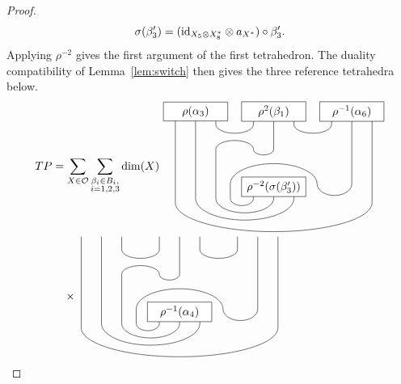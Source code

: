 \documentclass{amsart}
\begin{document}
\begin{proof}
\[
\sigma(\beta'_3)=(\mathrm{id}_{X_5\otimes X_8^*}\otimes a_{X^*})\circ\beta'_3.
\]
Applying $\rho^{-2}$ gives the first argument of the first tetrahedron. The duality compatibility of Lemma~\ref{lem:switch} then gives the three reference tetrahedra below.
\begin{align*}
TP &=\sum_{X \in \mathcal{O}} \sum_{\substack{\beta_i \in B_i, \\ i=1,2,3}} \dim(X)
\vcenter{\hbox{
\begin{tikzpicture}[scale=.9]
\draw (-.7+0.6,0)--++(0,-.4) node [left] {\tiny ${ }$} arc (0:-180:.4 and .25) --++(0,.5) arc (180:0:1.5 and .7) arc (-180:0:.6 and .4)  --++(0,2.5);
\draw (0+0.6,0)--++(0,-.4) node [right] {\tiny ${ }$} arc (0:-180:1 and .5) --++(0,1.7) arc (180:0:.65 and .3) arc (-180:0:.35 and .2) --++(0,1.3);
\draw (.7+0.6,0)--++(0,-.4) node [right] {\tiny ${ }$} arc (0:-180:1.7 and .75) --++(0,3);
\draw (-2.1-.7,2.6)--++(0,-.45) --++(0,-2.7) arc (-180:0:3.4 and 1);
\draw (-2.1+.7,2.6)--++(0,-.45) arc (-180:0:.65 and .3);
\draw (0.6-.7,2.6)--++(0,-.45)  node [left] {\tiny ${ }$};
\draw (0.6+.7,2.6)--++(0,-.45) arc (-180:0:.65 and .3);
\draw (3.3-.7,2.6)--++(0,-.45) node [left] {\tiny ${ }$};
\draw (3.3+.7,2.6)--++(0,-.45) node [right] {\tiny ${ }$} --++(0,-2.7);
\draw (0.6,0) node [draw,fill=white,minimum width=2cm] {$\rho^{-2}(\sigma(\beta'_3))$};
\draw (-2.1,2.6) node [draw,fill=white,minimum width=2cm] {$\rho(\alpha_3)$};
\draw (0.6,2.6) node [draw,fill=white,minimum width=2cm] {$\rho^2(\beta_1)$};
\draw (3.3,2.6) node [draw,fill=white,minimum width=2cm] {$\rho^{-1}(\alpha_6)$};
\end{tikzpicture}}}
\\*
&\quad{}\mathbin{\times}
\vcenter{\hbox{
\begin{tikzpicture}[scale=.9]
\draw (-.7+0.6,0)--++(0,-.4) node [left] {\tiny ${ }$} arc (0:-180:.4 and .25) --++(0,.5) arc (180:0:1.5 and .7) arc (-180:0:.6 and .4)  --++(0,2.5);
\draw (0+0.6,0)--++(0,-.4) node [right] {\tiny ${ }$} arc (0:-180:1 and .5) --++(0,1.7) arc (180:0:.65 and .3) arc (-180:0:.35 and .2) --++(0,1.3);
\draw (.7+0.6,0)--++(0,-.4) node [right] {\tiny ${ }$} arc (0:-180:1.7 and .75) --++(0,3);
\draw (-2.1-.7,2.6)--++(0,-.45) --++(0,-2.7) arc (-180:0:3.4 and 1);
\draw (-2.1+.7,2.6)--++(0,-.45) arc (-180:0:.65 and .3);
\draw (0.6-.7,2.6)--++(0,-.45)  node [left] {\tiny ${ }$};
\draw (0.6+.7,2.6)--++(0,-.45) arc (-180:0:.65 and .3);
\draw (3.3-.7,2.6)--++(0,-.45) node [left] {\tiny ${ }$};
\draw (3.3+.7,2.6)--++(0,-.45) node [right] {\tiny ${ }$} --++(0,-2.7);
\draw (0.6,0) node [draw,fill=white,minimum width=2cm] {$\rho^{-1}(\alpha_4)$};

\end{tikzpicture}}}
\end{align*}
\end{proof}
\end{document}
